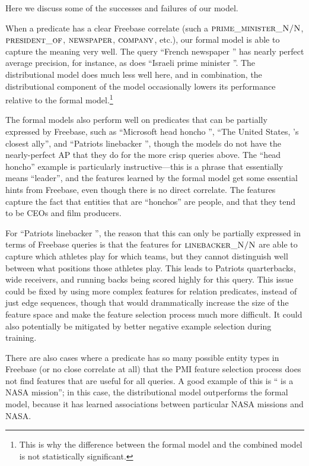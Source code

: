 \documentclass[11pt]{article}
\newcommand{\blank}{\underline{\hspace{.5cm}}}
\newcommand{\predicate}[1]{\ensuremath{\textsc{#1}}}
\begin{document}
Here we discuss some of the successes and failures of our model.

When a predicate has a clear Freebase correlate (such a
\predicate{prime\_minister\_N/N}, \predicate{president\_of},
\predicate{newspaper}, \predicate{company}, etc.), our formal model is able to
capture the meaning very well.  The query ``French newspaper \blank{}'' has
nearly perfect average precision, for instance, as does ``Israeli prime
minister \blank{}''.  The distributional model does much less well here, and in
combination, the distributional component of the model occasionally lowers its
performance relative to the formal model.\footnote{This is why the difference
between the formal model and the combined model is not statistically
significant.}

The formal models also perform well on predicates that can be partially
expressed by Freebase, such as ``Microsoft head honcho \blank{}'', ``The United
States, \blank{}'s closest ally'', and ``Patriots linebacker \blank{}'', though
the models do not have the nearly-perfect AP that they do for the more crisp
queries above.  The ``head honcho'' example is particularly instructive---this
is a phrase that essentially means ``leader'', and the features learned by the
formal model get some essential hints from Freebase, even though there is no
direct correlate.  The features capture the fact that entities that are
``honchos'' are people, and that they tend to be CEOs and film producers.

For ``Patriots linebacker \blank{}'', the reason that this can only be
partially expressed in terms of Freebase queries is that the features for
\predicate{linebacker\_N/N} are able to capture which athletes play for which
teams, but they cannot distinguish well between what positions those athletes
play.  This leads to Patriots quarterbacks, wide receivers, and running backs
being scored highly for this query.  This issue could be fixed by using more
complex features for relation predicates, instead of just edge sequences,
though that would drammatically increase the size of the feature space and make
the feature selection process much more difficult.  It could also potentially
be mitigated by better negative example selection during training.

There are also cases where a predicate has so many possible entity types in
Freebase (or no close correlate at all) that the PMI feature selection process
does not find features that are useful for all queries.  A good example of this
is ``\blank{} is a NASA mission''; in this case, the distributional model
outperforms the formal model, because it has learned associations between
particular NASA missions and NASA.
\end{document}
